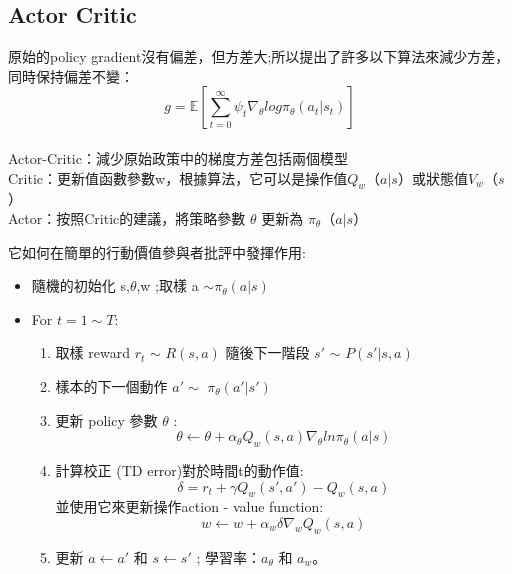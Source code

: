 \subsection{Actor Critic}
原始的policy gradient沒有偏差，但方差大;所以提出了許多以下算法來減少方差，同時保持偏差不變：\\[5pt]
$$g = \mathbb{E}[\sum_{t=0}^\infty\psi_t\nabla_\theta log\pi_\theta(a_t \vert s_t)]$$\\[5pt]
Actor-Critic：減少原始政策中的梯度方差包括兩個模型\\[5pt]
Critic：更新值函數參數w，根據算法，它可以是操作值$ Q_w$（$a \vert s$）或狀態值$V_w$（$s$） \\[5pt]
Actor：按照Critic的建議，將策略參數 $\theta$ 更新為 $\pi_\theta$（$a \vert s$）\\[5pt]
\begin{Large}
它如何在簡單的行動價值參與者批評中發揮作用:
\end{Large}
\begin{itemize}
\item 隨機的初始化 s,$\theta$,w ;取樣 a $\sim
\pi_\theta(a \vert s)$
\end{itemize}
\begin{itemize}
\item For $t =1 \sim T:$ 
\begin{enumerate}[1]
\item 取樣 reward $r_t$ $\sim$ $R(s,a)$ 隨後下一階段 $s'$ $\sim$ $P(s'\vert s,a)$ 
\item 樣本的下一個動作 $a' \sim$ $\pi_\theta(a'\vert s')$
\item 更新 policy 參數 $\theta$ :\\
$$\theta\leftarrow\theta+\alpha_\theta Q_w(s,a)\nabla_\theta ln\pi_\theta(a\vert s)$$
\item 計算校正 (TD error)對於時間t的動作值:\\
$$\delta = r_t + \gamma Q_w(s',a')-Q_w(s,a)$$
並使用它來更新操作action - value function:\\
$$w\leftarrow w+\alpha_w \delta \nabla_w Q_w(s,a) $$
\item 更新 $a\leftarrow a'$ 和 $ s \leftarrow s'$ ; 學習率：$a_\theta$ 和 $a_w$。
\end{enumerate}   
\end{itemize}\newpage

\iffalse
